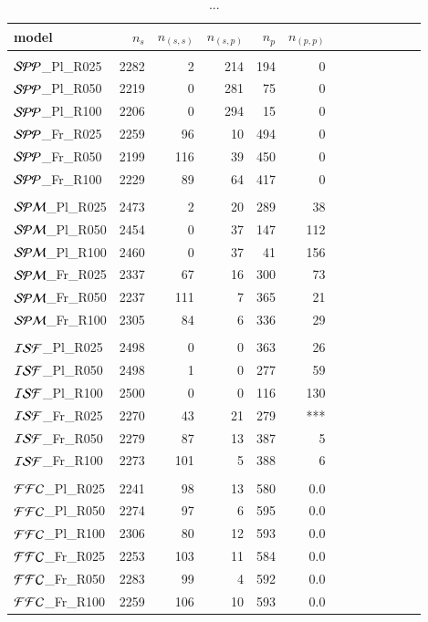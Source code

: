 \documentclass[aa]{lib/aa}
\begin{document}
\begin{table}
 \caption{...}
 \label{Tab:model_numbers}
 \centering 
 \begin{tabular}{lrrrrrrrrrrrr}
   \hline\hline
   model & $n_{s}$ & $n_{(s,s)}$ & $n_{(s,p)}$ & $n_{p}$ & $n_{(p,p)}$ \\
        \hline \vspace{-0.75em}\\
${\cal SPP}$\_Pl\_R025 & 2282 &  2 & 214 & 194 & 0  \\
${\cal SPP}$\_Pl\_R050 & 2219 &  0 & 281 &  75 & 0  \\
${\cal SPP}$\_Pl\_R100 & 2206 &  0 & 294 &  15 & 0  \\
${\cal SPP}$\_Fr\_R025 & 2259 & 96 &  10 & 494 & 0  \\
${\cal SPP}$\_Fr\_R050 & 2199 &116 &  39 & 450 & 0  \\ %
${\cal SPP}$\_Fr\_R100 & 2229 & 89 &  64 & 417 & 0  \\ %
 \hline
  \hline \vspace{-0.75em}\\
${\cal SPM}$\_Pl\_R025 & 2473 &  2 &  20 & 289 &  38 \\
${\cal SPM}$\_Pl\_R050 & 2454 &  0 &  37 & 147 & 112 \\
${\cal SPM}$\_Pl\_R100 & 2460 &  0 &  37 &  41 & 156 \\
${\cal SPM}$\_Fr\_R025 & 2337 & 67 &  16 & 300 &  73  \\
${\cal SPM}$\_Fr\_R050 & 2237 &111 &   7 & 365 &  21 \\
${\cal SPM}$\_Fr\_R100 & 2305 & 84 &   6 & 336 &  29  \\
  
  \hline
  \hline \vspace{-0.75em}\\
${\cal ISF}$\_Pl\_R025 & 2498 &   0 &  0 & 363 &  26  \\
${\cal ISF}$\_Pl\_R050 & 2498 &   1 &  0 & 277 &  59  \\
${\cal ISF}$\_Pl\_R100 & 2500 &   0 &  0 & 116 & 130  \\
${\cal ISF}$\_Fr\_R025 & 2270 &  43 & 21 & 279 & ***  \\ %
${\cal ISF}$\_Fr\_R050 & 2279 &  87 & 13 & 387 &   5 \\
${\cal ISF}$\_Fr\_R100 & 2273 & 101 &  5 & 388 &   6 \\
  \hline
  \hline \vspace{-0.75em}\\
${\cal FFC}$\_Pl\_R025 & 2241 &  98 & 13 & 580 & 0.0  \\
${\cal FFC}$\_Pl\_R050 & 2274 &  97 &  6 & 595 & 0.0  \\
${\cal FFC}$\_Pl\_R100 & 2306 &  80 & 12 & 593 & 0.0  \\
${\cal FFC}$\_Fr\_R025 & 2253 & 103 & 11 & 584 & 0.0  \\
${\cal FFC}$\_Fr\_R050 & 2283 &  99 &  4 & 592 & 0.0  \\
${\cal FFC}$\_Fr\_R100 & 2259 & 106 & 10 & 593 & 0.0  \\
  \hline
 \end{tabular}
\end{table}
\end{document}
